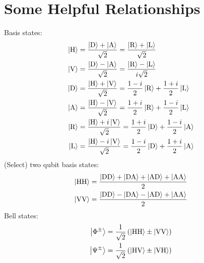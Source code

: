 \section{Some Helpful Relationships}
	
	Basis states:
	\begin{align}
		\H &= \frac{\D + \A}{\sqrt{2}} = \frac{\R + \L}{\sqrt{2}} \\
		\V &= \frac{\D - \A}{\sqrt{2}} = \frac{\R - \L}{i\sqrt{2}} \\
		\D &= \frac{\H + \V}{\sqrt{2}} = \frac{1-i}{2}\R + \frac{1+i}{2}\L \\
		\A &= \frac{\H - \V}{\sqrt{2}} = \frac{1+i}{2}\R + \frac{1-i}{2}\L \\
		\R &= \frac{\H + i\V}{\sqrt{2}} = \frac{1+i}{2}\D + \frac{1-i}{2}\A \\
		\L &= \frac{\H - i\V}{\sqrt{2}} = \frac{1-i}{2}\D + \frac{1+i}{2}\A
	\end{align}
	(Select) two qubit basis states:
	\begin{align}
		\HH &= \frac{\DD+\DA+\AD+\AA}{2} \\
		\VV &= \frac{\DD-\DA-\AD+\AA}{2} \\
	\end{align}
	Bell states:
	\begin{align}
		\ket{\Phi^\pm} &= \frac{1}{\sqrt{2}}\left(\HH\pm\VV\right) \\
		\ket{\Psi^\pm} &= \frac{1}{\sqrt{2}}\left(\HV\pm\VH\right)
	\end{align}
	